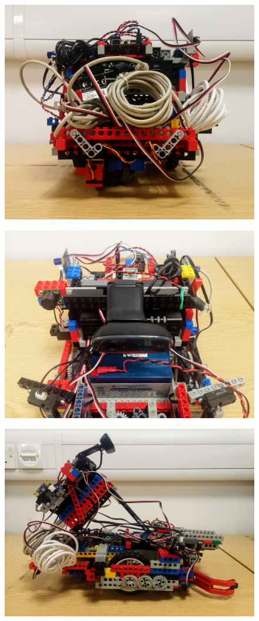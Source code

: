 \begin{figure}[ht]
    \centering
    \includegraphics[width=0.7\linewidth]{res/robot-pics/view-back.jpg}
    \caption{}
    \label{fig:}
\end{figure}

\begin{figure}[ht]
    \centering
    \includegraphics[width=0.7\linewidth]{res/robot-pics/top-on.jpg}
    \caption{}
    \label{fig:}
\end{figure}

\begin{figure}[ht]
    \centering
    \includegraphics[width=0.7\linewidth]{res/robot-pics/top-off-side-view.jpg}
    \caption{}
    \label{fig:}
\end{figure}

